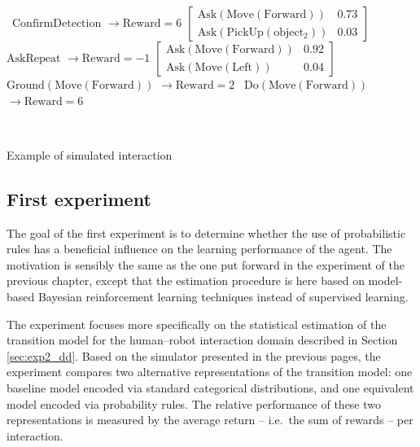 \begin{Transcript}[p!]
\begin{normalsize}
\begin{dialogue}
 \ $\mathrm{ConfirmDetection}$ \hspace{34mm} $\rightarrow \mathrm{Reward} = 6$ \vspace{3mm}
 $\begin{bmatrix}\mathrm{Ask(Move(Forward))} & 0.73 \\
\mathrm{Ask(PickUp(object_2))}& 0.03 \end{bmatrix}$ \vspace{3mm}
 \ $\mathrm{AskRepeat}$ \hspace{47mm} $\rightarrow \mathrm{Reward} = -1$ \vspace{3mm}
 $\begin{bmatrix}\mathrm{Ask(Move(Forward))} & 0.92 \\
\mathrm{Ask(Move(Left))} & 0.04 \end{bmatrix}$ \vspace{3mm}
 \ $\mathrm{Ground(Move(Forward))}$ \hspace{22mm} $\rightarrow \mathrm{Reward} = 2$ \vspace{3mm}
 \ $\mathrm{Do(Move(Forward))}$ \hspace{31mm} $\rightarrow \mathrm{Reward} = 6$
\end{dialogue}
$\phantom{a}$\hspace{13mm} \vspace{3mm}
\end{normalsize}
\caption{Example of simulated interaction}
\end{Transcript}

\subsection{First experiment}

The goal of the first experiment is to determine whether the use of probabilistic rules has a beneficial influence on the learning performance of the agent. The motivation is sensibly the same as the one put forward in the experiment of the previous chapter, except that the estimation procedure is here based on model-based Bayesian reinforcement learning techniques instead of supervised learning. 

The experiment focuses more specifically on the statistical estimation of the transition model for the human--robot interaction domain described in Section \ref{sec:exp2_dd}. Based on the simulator presented in the previous pages, the experiment compares two alternative representations of the transition model: one baseline model encoded via standard categorical distributions, and one equivalent model encoded via probability rules.  The relative performance of these two representations is measured by the average return -- i.e.\ the sum of rewards -- per interaction. 

